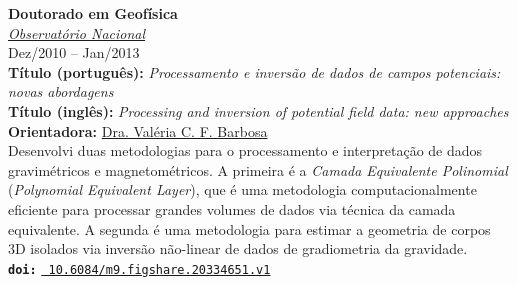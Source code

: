  \textbf{\large Doutorado em Geof{\'i}sica} \\
 \href{https://www.gov.br/observatorio/pt-br}{\textsl{Observat\'{o}rio Nacional}} \\
 Dez/2010 -- Jan/2013 \vspace{0.3\baselineskip} \\
\noindent \textbf{Título (portugu{\^e}s):} \textit{Processamento e invers\~{a}o de dados de campos potenciais: novas abordagens} \\
\noindent \textbf{Título (ingl{\^e}s):} \textit{Processing and inversion of potential field data: new approaches} \\
\noindent \textbf{Orientadora:} \href{https://orcid.org/0000-0002-9767-6044}{Dra. Val{\'e}ria C. F. Barbosa} \\
Desenvolvi duas metodologias para o 
processamento e interpretação de dados gravimétricos e magnetométricos. A primeira é
a \textit{Camada Equivalente Polinomial} (\textit{Polynomial Equivalent Layer}), que 
é uma metodologia computacionalmente eficiente para processar grandes volumes de dados 
via t{\'e}cnica da camada equivalente. A segunda {\'e} uma metodologia para estimar a
geometria de corpos 3D isolados via inversão não-linear de dados de gradiometria da gravidade. \\
\noindent \texttt{\textbf{doi:}}  \href{https://doi.org/10.6084/m9.figshare.20334651.v1}{\texttt{ 10.6084/m9.figshare.20334651.v1}} \\

\medskip

